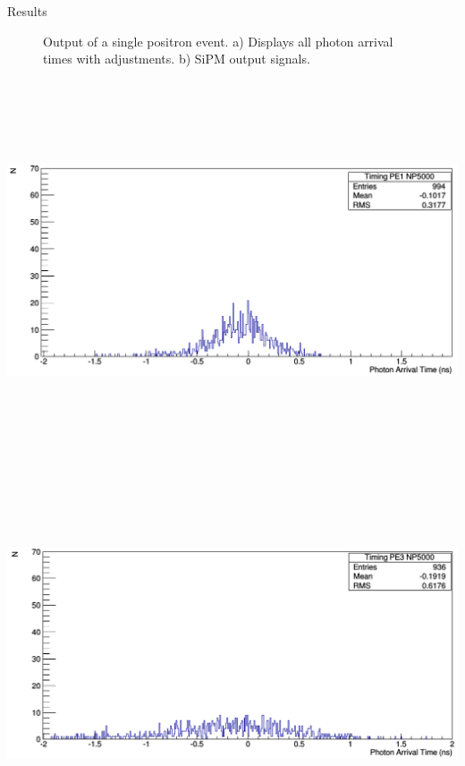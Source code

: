 \documentclass[final]{beamer}
\newlength{\onecolwid}
\newlength{\twocolwid}
\begin{document}
\begin{frame}[t]
\begin{columns}[t]
\begin{column}{\twocolwid}
\begin{columns}[t,totalwidth=\twocolwid]
\begin{column}{\onecolwid}
\begin{block}{Results}
\begin{figure}
\caption{Output of a single positron event. a) Displays all photon arrival times with adjustments. b) SiPM output signals.}
\end{figure}

\centering
\includegraphics[height=11.2cm]{d6}
\newline
\includegraphics[height=11.2cm]{d7}
\newline

\end{block}
\end{column}
\end{columns}
\end{column}
\end{columns}
\end{frame}
\end{document}
